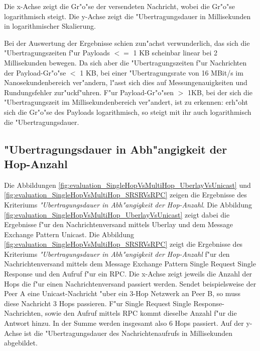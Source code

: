 Die x-Achse zeigt die Gr"o"se der versendeten Nachricht, wobei die Gr"o"se logarithmisch steigt. Die y-Achse zeigt die "Ubertragungsdauer in Millisekunden in logarithmischer Skalierung.

Bei der Auswertung der Ergebnisse schien zun"achst verwunderlich, das sich die "Ubertragungszeiten f"ur Payloads $<=$ 1 KB scheinbar linear bei 2 Millisekunden bewegen. Da sich aber die "Ubertragungszeiten f"ur Nachrichten der Payload-Gr"o"se $<$ 1 KB, bei einer "Ubertragungsrate von 16 MBit/s im Nanosekundenbereich ver"andern, l"asst sich dies auf Messungenauigkeiten und Rundungsfehler zur"uckf"uhren. F"ur Payload-Gr"o"sen $>$ 1KB, bei der sich die "Ubertragungszeit  im Millisekundenbereich ver"andert, ist zu erkennen: erh"oht sich die Gr"o"se des Payloads logarithmisch, so steigt mit ihr auch logarithmisch die "Ubertragungsdauer.

\subsection{"Ubertragungsdauer in Abh"angigkeit der Hop-Anzahl}



Die Abbildungen \ref{fig:evaluation_SingleHopVsMultiHop_UberlayVsUnicast} und \ref{fig:evaluation_SingleHopVsMultiHop_SRSRVsRPC} zeigen die Ergebnisse des Kriteriums \emph{"Ubertragungsdauer in Abh"angigkeit der Hop-Anzahl}. Die Abbildung \ref{fig:evaluation_SingleHopVsMultiHop_UberlayVsUnicast} zeigt dabei die Ergebnisse f"ur den Nachrichtenversand mittels Uberlay und dem Message Exchange Pattern Unicast. Die Abbildung \ref{fig:evaluation_SingleHopVsMultiHop_SRSRVsRPC} zeigt die Ergebnisse des Kriteriums \emph{"Ubertragungsdauer in Abh"angigkeit der Hop-Anzahl} f"ur den Nachrichtenversand mittels dem Message Exchange Pattern Single Request Single Response und den Aufruf f"ur ein RPC. Die  x-Achse zeigt jeweils die Anzahl der Hops die f"ur einen Nachrichtenversand passiert werden. Sendet beispielsweise der Peer A eine Unicast-Nachricht "uber ein 3-Hop Netzwerk an Peer B, so muss diese Nachricht 3 Hops passieren. F"ur Single Request Single Response-Nachrichten, sowie den Aufruf mittels RPC kommt dieselbe Anzahl f"ur die Antwort hinzu. In der Summe werden insgesamt also 6 Hops passiert. Auf der y-Achse ist die "Ubertragungsdauer des Nachrichtenaufrufs in Millisekunden abgebildet.

